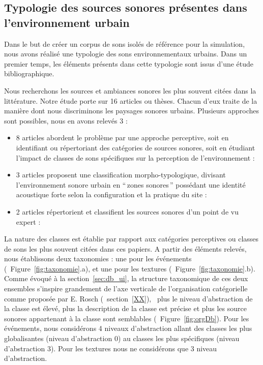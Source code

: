 \subsection{Typologie des sources sonores présentes dans l'environnement urbain}

Dans le but de créer un corpus de sons isolés de référence pour la simulation, nous avons réalisé une typologie des sons environnementaux urbains. Dans un premier temps, les éléments présents dans cette typologie sont issus d’une étude bibliographique.

Nous recherchons les sources et ambiances sonores les plus souvent citées dans la littérature. Notre étude porte sur 16 articles ou thèses. Chacun d’eux traite de la manière dont nous discriminons les paysages sonores urbains. Plusieurs approches sont possibles, nous en avons relevés 3 :

\begin{itemize}
\item 8 articles abordent le problème par une approche perceptive, soit en identifiant ou répertoriant des catégories de sources sonores, soit en étudiant l'impact de classes de sons spécifiques sur la perception de l'environnement : \cite{maffiolo_caracterisation_1999,raimbault2002simulation,guastavino_etude_2003,defreville2004aactivity,raimbault2005urban,dubois2006cognitive,devergie_relations_2006,guastavino2006ideal,niessen2010categories}
\item 3 articles proposent une classification morpho-typologique, divisant l’environnement sonore urbain en ``\,zones sonores\,'' possédant une identité acoustique forte selon la configuration et la pratique du site : \cite{maffiolo_caracterisation_1999,beaumont2004pertinence,polack2008perceptive}
\item 2 articles répertorient et classifient les sources sonores d’un point de vu expert : \cite{leobon_analyse_1986,brown2011towards}
\end{itemize}

La nature des classes est établie par rapport aux catégories perceptives ou classes de sons les plus souvent citées dans ces papiers. A  partir des éléments relevés, nous établissons deux taxonomies : une pour les événements (\cf~Figure~\ref{fig:taxonomie}.a), et une pour les textures (\cf~Figure~\ref{fig:taxonomie}.b). Comme évoqué à la section~\ref{sec:db_ui}, la structure taxonomique de ces deux ensembles s'inspire grandement de l'axe verticale de l'organisation catégorielle comme proposée par E. Rosch (\Cf~section~\ref{XX}), \ie~plus le niveau d'abstraction de la classe est élevé, plus la description de la classe est précise et plus les source sonores appartenant à la classe sont semblables (\Cf~Figure~\ref{fig:orgDb}). Pour les événements, nous considérons 4 niveaux d'abstraction allant des classes les plus globalisantes (niveau d'abstraction 0) au classes les plus spécifiques (niveau d'abstraction 3). Pour les textures nous ne considérons que 3 niveau d'abstraction.

